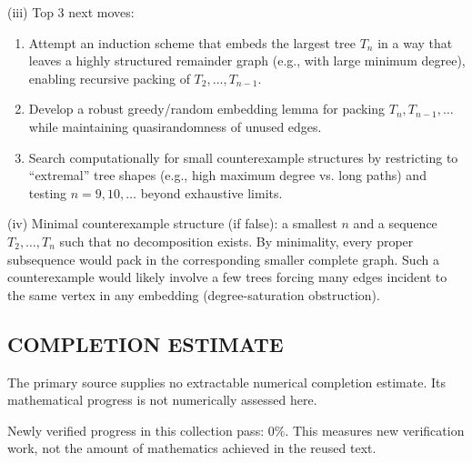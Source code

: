 (iii) Top 3 next moves:
\begin{enumerate}
\item Attempt an induction scheme that embeds the largest tree $T_n$ in a way that leaves a highly structured remainder graph (e.g., with large minimum degree), enabling recursive packing of $T_2,\dots,T_{n-1}$.
\item Develop a robust greedy/random embedding lemma for packing $T_n,T_{n-1},\dots$ while maintaining quasirandomness of unused edges.
\item Search computationally for small counterexample structures by restricting to ``extremal'' tree shapes (e.g., high maximum degree vs. long paths) and testing $n=9,10,\dots$ beyond exhaustive limits.
\end{enumerate}

(iv) Minimal counterexample structure (if false): a smallest $n$ and a sequence $T_2,\dots,T_n$ such that no decomposition exists. By minimality, every proper subsequence would pack in the corresponding smaller complete graph. Such a counterexample would likely involve a few trees forcing many edges incident to the same vertex in any embedding (degree-saturation obstruction).




\subsection*{COMPLETION ESTIMATE}
The primary source supplies no extractable numerical completion estimate. Its mathematical progress is not numerically assessed here.

Newly verified progress in this collection pass: $0\%$. This measures new verification work, not the amount of mathematics achieved in the reused text.
